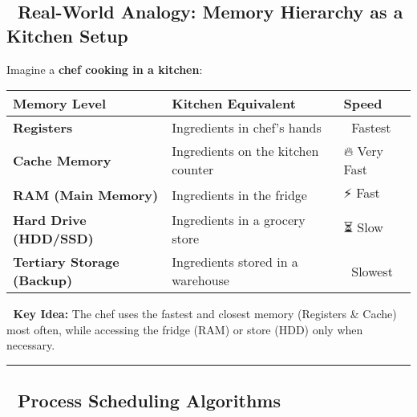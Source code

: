 \documentclass[
]{article}
\begin{document}
\subsection{\texorpdfstring{\textbf{📌 Real-World Analogy: Memory
Hierarchy as a Kitchen
Setup}}{📌 Real-World Analogy: Memory Hierarchy as a Kitchen Setup}}\label{real-world-analogy-memory-hierarchy-as-a-kitchen-setup}

Imagine a \textbf{chef cooking in a kitchen}:

\begin{longtable}[]{@{}
  >{\raggedright\arraybackslash}p{}
  >{\raggedright\arraybackslash}p{}
  >{\raggedright\arraybackslash}p{}@{}}
\toprule\noalign{}
\begin{minipage}[b]{\linewidth}\raggedright
\textbf{Memory Level}
\end{minipage} & \begin{minipage}[b]{\linewidth}\raggedright
\textbf{Kitchen Equivalent}
\end{minipage} & \begin{minipage}[b]{\linewidth}\raggedright
\textbf{Speed}
\end{minipage} \\
\midrule\noalign{}
\endhead
\bottomrule\noalign{}
\endlastfoot
\textbf{Registers} & Ingredients in chef's hands & 🚀 Fastest \\
\textbf{Cache Memory} & Ingredients on the kitchen counter & 🔥 Very
Fast \\
\textbf{RAM (Main Memory)} & Ingredients in the fridge & ⚡ Fast \\
\textbf{Hard Drive (HDD/SSD)} & Ingredients in a grocery store & ⏳
Slow \\
\textbf{Tertiary Storage (Backup)} & Ingredients stored in a warehouse &
🐌 Slowest \\
\end{longtable}

📌 \textbf{Key Idea:} The chef uses the fastest and closest memory
(Registers \& Cache) most often, while accessing the fridge (RAM) or
store (HDD) only when necessary.

\begin{center}\rule{0.5\linewidth}{0.5pt}\end{center}

\subsection{\texorpdfstring{\textbf{📌 Process Scheduling
Algorithms}}{📌 Process Scheduling Algorithms}}\label{process-scheduling-algorithms}
\end{document}
